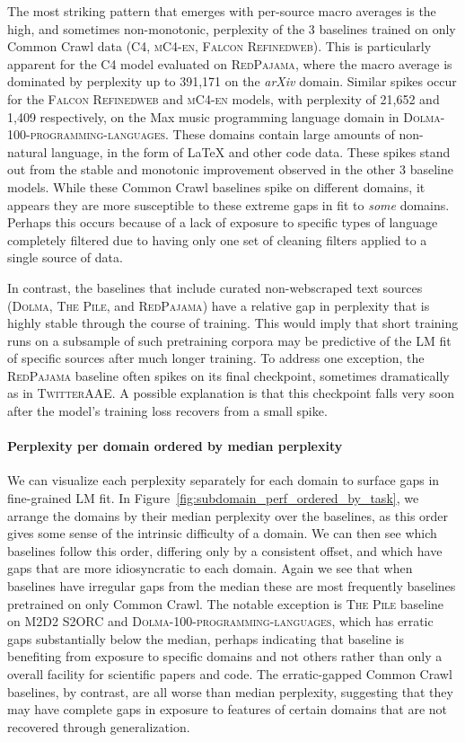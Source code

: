The most striking pattern that emerges with per-source macro averages is the high, and sometimes non-monotonic, perplexity of the 3 baselines trained on only Common Crawl data (\textsc{C4}, \textsc{mC4-en}, \textsc{Falcon Refinedweb}). This is particularly apparent for the \textsc{C4} model evaluated on \textsc{RedPajama}, where the macro average is dominated by perplexity up to 391,171 on the \textit{arXiv} domain. Similar spikes occur for the \textsc{Falcon Refinedweb} and \textsc{mC4-en} models, with perplexity of 21,652 and 1,409 respectively, on the Max music programming language domain in \textsc{Dolma-100-programming-languages}. These domains contain large amounts of non-natural language, in the form of LaTeX and other code data. These spikes stand out from the stable and monotonic improvement observed in the other 3 baseline models. While these Common Crawl baselines spike on different domains, it appears they are more susceptible to these extreme gaps in fit to \textit{some} domains. Perhaps this occurs because of a lack of exposure to specific types of language completely filtered due to having only one set of cleaning filters applied to a single source of data.

In contrast, the baselines that include curated non-webscraped text sources (\textsc{Dolma}, \textsc{The Pile}, and \textsc{RedPajama}) have a relative gap in perplexity that is highly stable through the course of training. This would imply that short training runs on a subsample of such pretraining corpora may be predictive of the LM fit of specific sources after much longer training. To address one exception, the \textsc{RedPajama} baseline often spikes on its final checkpoint, sometimes dramatically as in \textsc{TwitterAAE}. A possible explanation is that this checkpoint falls very soon after the model's training loss recovers from a small spike.

\paragraph{Perplexity per domain ordered by median perplexity} We can visualize each perplexity separately for each domain to surface gaps in fine-grained LM fit. In Figure~\ref{fig:subdomain_perf_ordered_by_task}, we arrange the domains by their median perplexity over the baselines, as this order gives some sense of the intrinsic difficulty of a domain. We can then see which baselines follow this order, differing only by a consistent offset, and which have gaps that are more idiosyncratic to each domain. Again we see that when baselines have irregular gaps from the median these are most frequently baselines pretrained on only Common Crawl. The notable exception is \textsc{The Pile} baseline on \textsc{M2D2 S2ORC} and \textsc{Dolma-100-programming-languages}, which has erratic gaps substantially below the median, perhaps indicating that baseline is benefiting from exposure to specific domains and not others rather than only a overall facility for scientific papers and code. The erratic-gapped Common Crawl baselines, by contrast, are all worse than median perplexity, suggesting that they may have complete gaps in exposure to features of certain domains that are not recovered through generalization.

